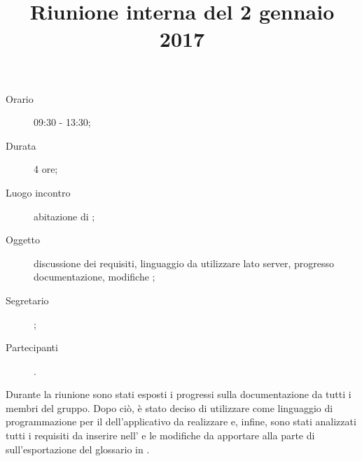 


\author{\PB}
\supervisor{\MM}
\title{Riunione interna del 2 gennaio 2017}



\maketitle

\begin{description}
	\item[Orario] 09:30 - 13:30;
	\item[Durata] 4 ore;
	\item[Luogo incontro] abitazione di \PB;
	\item[Oggetto] discussione dei requisiti, linguaggio da utilizzare lato server, progresso documentazione, modifiche ;
	\item[Segretario] \PB; 
	\item[Partecipanti] \ALL.
\end{description}

Durante la riunione sono stati esposti i progressi sulla documentazione da tutti i membri del gruppo. Dopo ciò, è stato deciso di utilizzare  come linguaggio di programmazione per il  dell'applicativo da realizzare e, infine, sono stati analizzati tutti i requisiti da inserire nell'\AdR{} e le modifiche da apportare alla parte  di  sull'esportazione del glossario in .


